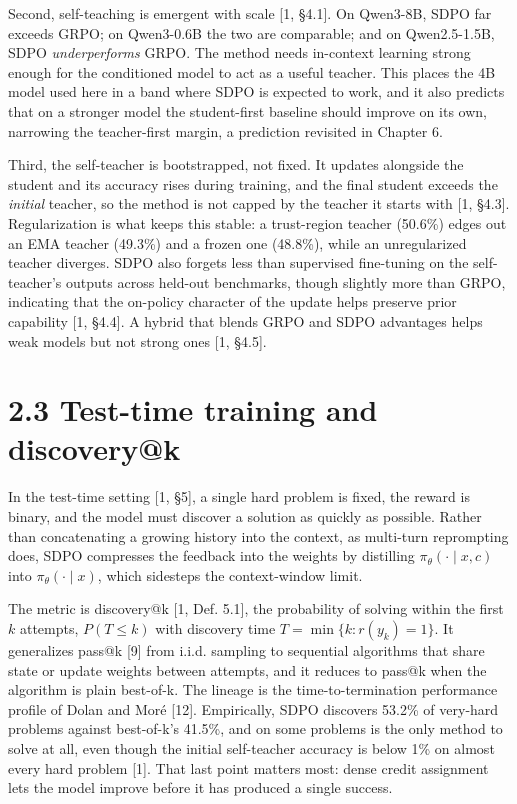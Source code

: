 Second, self-teaching is emergent with scale {[}1, §4.1{]}. On Qwen3-8B, SDPO far exceeds GRPO; on Qwen3-0.6B the two are comparable; and on Qwen2.5-1.5B, SDPO \emph{underperforms} GRPO. The method needs in-context learning strong enough for the conditioned model to act as a useful teacher. This places the 4B model used here in a band where SDPO is expected to work, and it also predicts that on a stronger model the student-first baseline should improve on its own, narrowing the teacher-first margin, a prediction revisited in Chapter 6.

Third, the self-teacher is bootstrapped, not fixed. It updates alongside the student and its accuracy rises during training, and the final student exceeds the \emph{initial} teacher, so the method is not capped by the teacher it starts with {[}1, §4.3{]}. Regularization is what keeps this stable: a trust-region teacher (50.6\%) edges out an EMA teacher (49.3\%) and a frozen one (48.8\%), while an unregularized teacher diverges. SDPO also forgets less than supervised fine-tuning on the self-teacher's outputs across held-out benchmarks, though slightly more than GRPO, indicating that the on-policy character of the update helps preserve prior capability {[}1, §4.4{]}. A hybrid that blends GRPO and SDPO advantages helps weak models but not strong ones {[}1, §4.5{]}.

\section{2.3 Test-time training and discovery@k}\label{test-time-training-and-discoveryk}

In the test-time setting {[}1, §5{]}, a single hard problem is fixed, the reward is binary, and the model must discover a solution as quickly as possible. Rather than concatenating a growing history into the context, as multi-turn reprompting does, SDPO compresses the feedback into the weights by distilling \(\pi_\theta(\cdot \mid x, c)\) into \(\pi_\theta(\cdot \mid x)\), which sidesteps the context-window limit.

The metric is discovery@k {[}1, Def. 5.1{]}, the probability of solving within the first \(k\) attempts, \(P(T \le k)\) with discovery time \(T = \min\{k : r(y_k) = 1\}\). It generalizes pass@k {[}9{]} from i.i.d. sampling to sequential algorithms that share state or update weights between attempts, and it reduces to pass@k when the algorithm is plain best-of-k. The lineage is the time-to-termination performance profile of Dolan and Moré {[}12{]}. Empirically, SDPO discovers 53.2\% of very-hard problems against best-of-k's 41.5\%, and on some problems is the only method to solve at all, even though the initial self-teacher accuracy is below 1\% on almost every hard problem {[}1{]}. That last point matters most: dense credit assignment lets the model improve before it has produced a single success.

